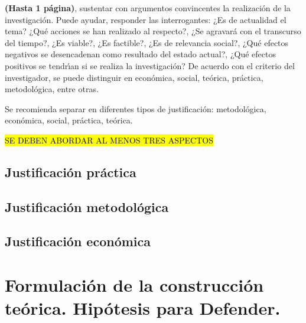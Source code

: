\textbf{(Hasta 1 p\'{a}gina)}, sustentar con argumentos convincentes la realizaci\'{o}n de la 
investigaci\'{o}n. Puede ayudar, responder las interrogantes: ¿Es de actualidad el tema? 
¿Qu\'{e} acciones se han realizado al respecto?, ¿Se agravar\'{a} con el transcurso del tiempo?, 
¿Es viable?, ¿Es factible?, ¿Es de relevancia social?, ¿Qu\'{e} efectos negativos se desencadenan 
como resultado del estado actual?, ¿Qu\'{e} efectos positivos se tendr\'{\i}an si se realiza la 
investigaci\'{o}n? De acuerdo con el criterio del investigador, se puede distinguir en 
econ\'{o}mica, social, te\'{o}rica, pr\'{a}ctica, metodol\'{o}gica, entre otras. 


Se recomienda separar en diferentes tipos de justificaci\'{o}n: metodol\'{o}gica, econ\'{o}mica, 
social, pr\'{a}ctica, te\'{o}rica. 


\hl{SE DEBEN ABORDAR AL MENOS TRES ASPECTOS} 


\subsection{Justificaci\'{o}n pr\'{a}ctica}
\label{cap0:sub:justificacion_practica}


\subsection{Justificaci\'{o}n metodol\'{o}gica}
\label{cap0:sub:justificacion_metodologica}


\subsection{Justificaci\'{o}n econ\'{o}mica}
\label{cap0:sub:justificacion_economica}


\section{Formulaci\'on de la construcci\'on te\'orica. Hip\'otesis para Defender.}
\label{cap0:sec:formulacion_de_la_construccion_teorica}

